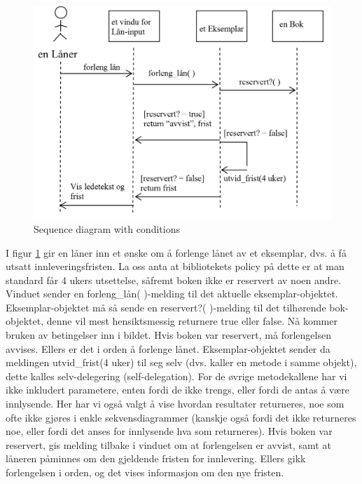 \begin{figure}[H]
    \centering
    \includegraphics[scale=0.35]{resources/sequence-diagram-with-conditions-example.PNG}
    \caption{Sequence diagram with conditions}
    \label{fig:sequence-diagram-with-conditions-example}
\end{figure}

I figur \ref{fig:sequence-diagram-with-conditions-example} gir en låner inn et ønske om å forlenge lånet av et eksemplar, dvs. å få utsatt innleveringsfristen. La oss anta at bibliotekets policy på dette er at man standard får 4 ukers utsettelse, såfremt boken ikke er reservert av noen andre. Vinduet sender en forleng\_lån( )-melding til det aktuelle eksemplar-objektet. Eksemplar-objektet må så sende en reservert?( )-melding til det tilhørende bok-objektet, denne vil mest hensiktsmessig returnere true eller false. Nå kommer bruken av betingelser inn i bildet. Hvis boken var reservert, må forlengelsen avvises. Ellers er det i orden å forlenge lånet. Eksemplar-objektet sender da meldingen utvid\_frist(4 uker) til seg selv (dvs. kaller en metode i samme objekt), dette kalles selv-delegering (self-delegation). For de øvrige metodekallene har vi ikke inkludert parametere, enten fordi de ikke trengs, eller fordi de antas å være innlysende. Her har vi også valgt å vise hvordan resultater returneres, noe som ofte ikke gjøres i enkle sekvensdiagrammer (kanskje også fordi det ikke returneres noe, eller fordi det anses for innlysende hva som returneres). Hvis boken var reservert, gis melding tilbake i vinduet om at forlengelsen er avvist, samt at låneren påminnes om den gjeldende fristen for innlevering. Ellers gikk forlengelsen i orden, og det vises informasjon om den nye fristen.

